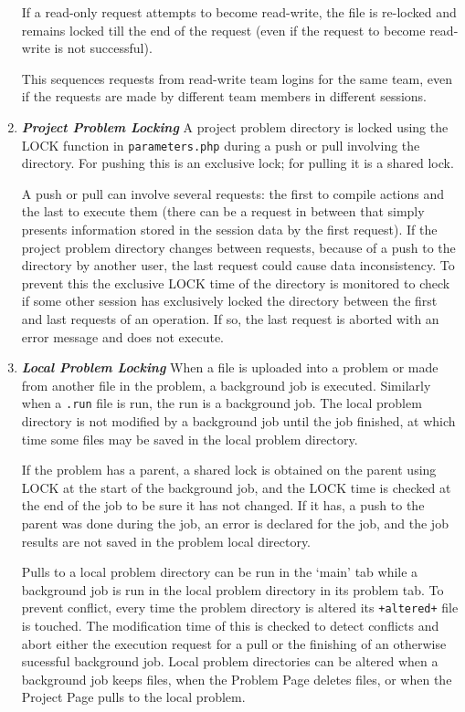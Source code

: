 \documentclass[12pt]{article}
\newcommand{\key}[1]{{\bf \em #1}}
\begin{document}
\begin{enumerate}
If a read-only request attempts to become read-write, the file
is re-locked and remains locked till the end of the request
(even if the request to become read-write is not successful).

This sequences requests from read-write team logins for the
same team, even if the requests are made by different team
members in different sessions.

\item \key{Project Problem Locking}
A project problem directory is locked using the
LOCK function in {\tt parameters.php}
during a push or pull involving the directory.
For pushing this is an exclusive lock; for pulling it is a shared
lock.

A push or pull can involve several requests:
the first to compile actions and the last to execute them
(there can be a request in between that simply presents
information stored in the session data by the first request).
If the project problem directory changes between requests,
because of a push to the directory by another user, the last
request could cause data inconsistency.  To prevent this
the exclusive LOCK time of the directory is monitored to check if some
other session has exclusively locked the directory between the
first and last requests of an operation.
If so, the last request is aborted with an error message and
does not execute.

\item \key{Local Problem Locking}
When a file is uploaded into a problem or made from another file
in the problem, a background job is executed.
Similarly when a {\tt .run} file is run, the run is a background job.
The local problem directory is not modified by a background job
until the job finished, at which time some files may be saved in
the local problem directory.

If the problem has a parent, a shared lock is
obtained on the parent using LOCK at the start of the background
job, and the LOCK time is checked at the end of the job to be sure
it has not changed.  If it has, a push to the parent was done
during the job, an error is declared for the job,
and the job results are not saved in the problem local directory.


Pulls to a local problem directory can be run in the `main' tab
while a background job is run in the local problem directory in
its problem tab.  To prevent conflict, every time the problem
directory is altered its {\tt +altered+} file is touched.
The modification time of this is checked to detect conflicts
and abort either the execution request for a pull or the
finishing of an otherwise sucessful background job.
Local problem directories can be altered when a background
job keeps files, when the Problem Page deletes files, or when
the Project Page pulls to the local problem.


\end{enumerate}
\end{document}
